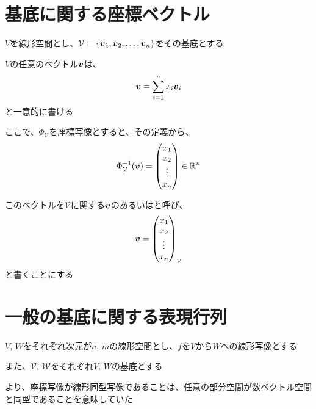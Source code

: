 \documentclass[../../../topic_linear-algebra]{subfiles}
\begin{document}
\sectionline
\section{基底に関する座標ベクトル}

$V$を線形空間とし、$\mathcal{V} = \{\vb*{v}_1, \vb*{v}_2, \ldots, \vb*{v}_n\}$をその基底とする

$V$の任意のベクトル$\vb*{v}$は、
\begin{equation*}
  \vb*{v} = \sum_{i=1}^n x_i \vb*{v}_i
\end{equation*}
と一意的に書ける

\br

ここで、$\Phi_\mathcal{V}$を座標写像とすると、その定義から、
\begin{equation*}
  \Phi^{-1}_\mathcal{V}(\vb*{v}) = \begin{pmatrix}
    x_1    \\
    x_2    \\
    \vdots \\
    x_n
  \end{pmatrix}
  \in \mathbb{R}^n
\end{equation*}

このベクトルを$\mathcal{V}$に関する$\vb*{v}$のあるいはと呼び、
\begin{equation*}
  \vb*{v} = \begin{pmatrix}
    x_1    \\
    x_2    \\
    \vdots \\
    x_n
  \end{pmatrix}_{\mathcal{V}}
\end{equation*}
と書くことにする

\sectionline
\section{一般の基底に関する表現行列}

$V,\,W$をそれぞれ次元が$n,\,m$の線形空間とし、$f$を$V$から$W$への線形写像とする

また、$\mathcal{V}, \, \mathcal{W}$をそれぞれ$V,\,W$の基底とする

\br

より、座標写像が線形同型写像であることは、任意の部分空間が数ベクトル空間と同型であることを意味していた
\end{document}
